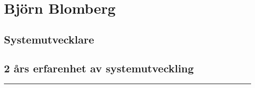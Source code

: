 \documentclass{article}
\begin{document}
\begin{minipage}[t]{0.7\textwidth}
\titleformat{\section}{\Huge\bfseries}{\thesection}{1em}{}
\section*{\textcolor{colorBlue}{Björn Blomberg}}
\subsection*{\textcolor{colorRed}{Systemutvecklare}}
\subsection*{2 års erfarenhet av systemutveckling}
\rule{7cm}{0.4pt}
\titleformat{\section}{\Large\bfseries}{\thesection}{1em}{}
\vspace{1.5cm}
\end{minipage}%
\begin{minipage}[t]{0.3\textwidth}
\vspace{-10pt} %
\end{minipage}%
\end{document}

